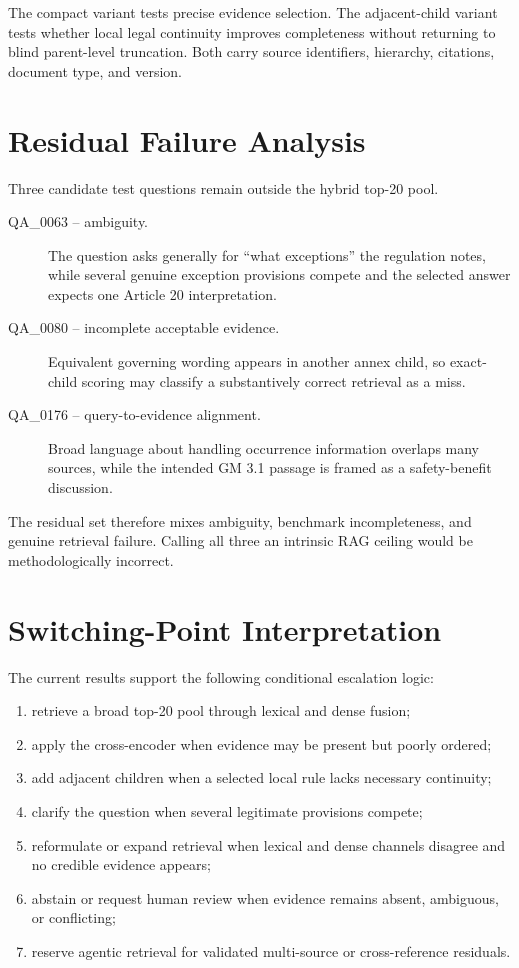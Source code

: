 The compact variant tests precise evidence selection. The adjacent-child variant tests whether local legal continuity improves completeness without returning to blind parent-level truncation. Both carry source identifiers, hierarchy, citations, document type, and version.

\section{Residual Failure Analysis}
\label{sec:residuals}

Three candidate test questions remain outside the hybrid top-20 pool.

\begin{description}
  \item[QA\_0063 -- ambiguity.] The question asks generally for \enquote{what exceptions} the regulation notes, while several genuine exception provisions compete and the selected answer expects one Article 20 interpretation.
  \item[QA\_0080 -- incomplete acceptable evidence.] Equivalent governing wording appears in another annex child, so exact-child scoring may classify a substantively correct retrieval as a miss.
  \item[QA\_0176 -- query-to-evidence alignment.] Broad language about handling occurrence information overlaps many sources, while the intended GM 3.1 passage is framed as a safety-benefit discussion.
\end{description}

The residual set therefore mixes ambiguity, benchmark incompleteness, and genuine retrieval failure. Calling all three an intrinsic RAG ceiling would be methodologically incorrect.

\section{Switching-Point Interpretation}

The current results support the following conditional escalation logic:

\begin{enumerate}
  \item retrieve a broad top-20 pool through lexical and dense fusion;
  \item apply the cross-encoder when evidence may be present but poorly ordered;
  \item add adjacent children when a selected local rule lacks necessary continuity;
  \item clarify the question when several legitimate provisions compete;
  \item reformulate or expand retrieval when lexical and dense channels disagree and no credible evidence appears;
  \item abstain or request human review when evidence remains absent, ambiguous, or conflicting;
  \item reserve agentic retrieval for validated multi-source or cross-reference residuals.
\end{enumerate}

